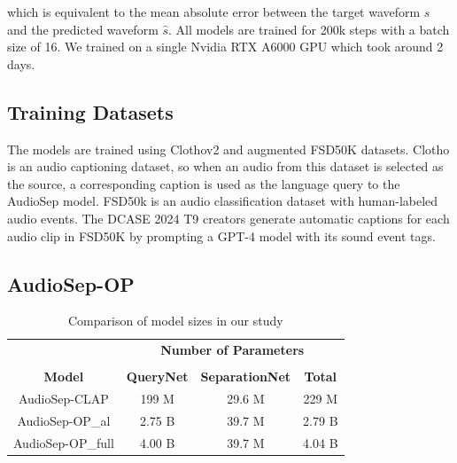 \documentclass[11pt]{article}
\begin{document}
\noindent which is equivalent to the mean absolute error between the target waveform $s$ and the predicted waveform $\hat{s}$. All models are trained for 200k steps with a batch size of 16. We trained on a single Nvidia RTX A6000 GPU which took around 2 days.


\subsection{Training Datasets}
The models are trained using Clothov2 \cite{clotho} and augmented FSD50K \cite{fsd50k} datasets. Clotho is an audio captioning dataset, so when an audio from this dataset is selected as the source, a corresponding caption is used as the language query to the AudioSep model. FSD50k is an audio classification dataset with human-labeled audio events. The DCASE 2024 T9 creators generate automatic captions for each audio clip in FSD50K by prompting a GPT-4  model with its sound event tags. 



\subsection{AudioSep-OP}

\begin{table}[!htbp]
  \centering
  \begin{tabular}{cccc}
                               & \multicolumn{3}{c}{\textbf{Number of Parameters}} \\
    \cline{2-4}
    \vspace{0.25mm} \\  
    \textbf{Model}             & \textbf{QueryNet}  & \textbf{SeparationNet} & \textbf{Total} \\
    \hline
    AudioSep-CLAP              &  199 M             &  29.6 M                & 229 M          \\
    AudioSep-OP\_al     &  2.75 B            &  39.7 M                & 2.79 B         \\
    AudioSep-OP\_full   &  4.00  B           &  39.7 M                & 4.04 B         \\
    \hline
  \end{tabular}
  \caption{Comparison of model sizes in our study}
\end{table}
\end{document}
